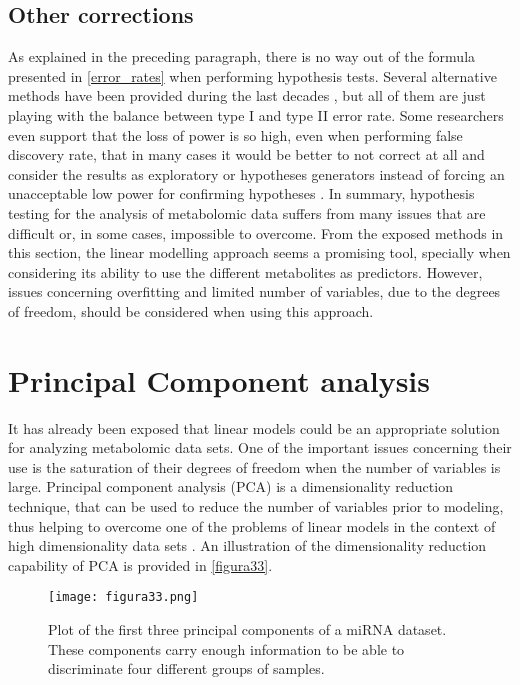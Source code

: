 \subsection{Other corrections}
As explained in the preceding paragraph, there is no way out of the formula presented in \autoref{error_rates} when performing hypothesis tests. Several alternative methods have been provided during the last decades \parencite{benjamini2001control, gao2008multiple, castro2015adjusted}, but all of them are just playing with the balance between type I and type II error rate. Some researchers even support that the loss of power is so high, even when performing false discovery rate, that in many cases it would be better to not correct at all and consider the results as exploratory or hypotheses generators instead of forcing an unacceptable low power for confirming hypotheses \parencite{bender2001adjusting}.
In summary, hypothesis testing for the analysis of metabolomic data suffers from many issues that are difficult or, in some cases, impossible to overcome. From the exposed methods in this section, the linear modelling approach seems a promising tool, specially when considering its ability to use the different metabolites as predictors. However, issues concerning overfitting and limited number of variables, due to the degrees of freedom, should be considered when using this approach. 

\section{Principal Component analysis}
\label{sec:PCA}
It has already been exposed that linear models could be an appropriate solution for analyzing metabolomic data sets. One of the important issues concerning their use is the saturation of their degrees of freedom when the number of variables is large. Principal component analysis (PCA) is a dimensionality reduction technique, that can be used to reduce the number of variables prior to modeling, thus helping to overcome one of the problems of linear models in the context of high dimensionality data sets \parencite{hotelling1933analysis, wang2008principal}. An illustration of the dimensionality reduction capability of PCA is provided in \autoref{figura33}.


\begin{figure}[hbtp]
	\centering
\texttt{[image: figura33.png]}
\caption[Plot of the first three principal components of a miRNA dataset]{Plot of the first three principal components of a miRNA dataset. These components carry enough information to be able to discriminate four different groups of samples.}
\label{figura33}
\end{figure}

